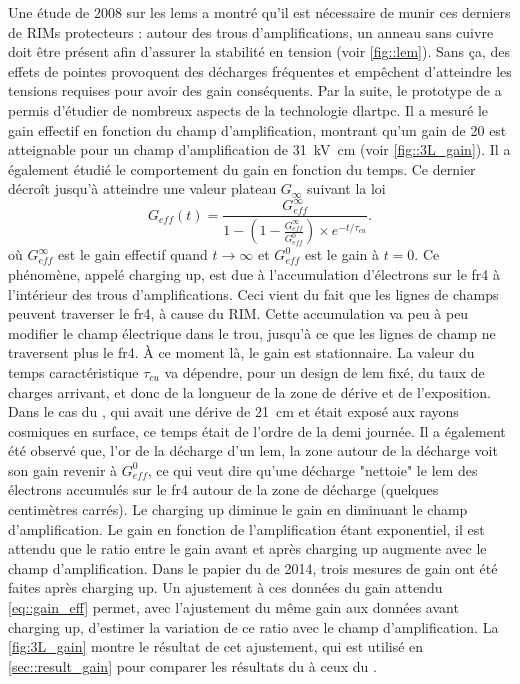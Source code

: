       Une étude de 2008 sur les \glspl{lem}\cite{Breskin2008} a montré qu'il est nécessaire de munir ces derniers de RIMs protecteurs : autour des trous d'amplifications, un anneau sans cuivre doit être présent afin d'assurer la stabilité en tension (voir \autoref{fig::lem}). Sans ça, des effets de pointes provoquent des décharges fréquentes et empêchent d'atteindre les tensions requises pour avoir des gain conséquents. Par la suite, le prototype de \threeL{}\cite{Cantini2013,Cantini2014} a permis d'étudier de nombreux aspects de la technologie \gls{dlartpc}. Il a mesuré le gain effectif en fonction du champ d'amplification, montrant qu'un gain de 20 est atteignable pour un champ d'amplification de \SI{31}{\kilo\volt\centi\meter} (voir \autoref{fig::3L_gain}). Il a également étudié le comportement du gain en fonction du temps. Ce dernier décroît jusqu'à atteindre une valeur plateau $G_{\infty}$ suivant la loi
      \begin{equation}
        G_{eff}(t) = \frac{G_{eff}^{\infty}}{1-(1-\frac{G_{eff}^{\infty}}{G_{eff}^0})\times e^{-t/\tau_{cu}}}.
      \end{equation}
      où $G_{eff}^{\infty}$ est le gain effectif quand $t\to\infty$ et $G_{eff}^0$ est le gain à $t=0$. Ce phénomène, appelé charging up, est due à l'accumulation d'électrons sur le \gls{fr4} à l'intérieur des trous d'amplifications. Ceci vient du fait que les lignes de champs peuvent traverser le \gls{fr4}, à cause du RIM. Cette accumulation va peu à peu modifier le champ électrique dans le trou, jusqu'à ce que les lignes de champ ne traversent plus le \gls{fr4}. À ce moment là, le gain est stationnaire. La valeur du temps caractéristique $\tau_{cu}$ va dépendre, pour un design de \gls{lem} fixé, du taux de charges arrivant, et donc de la longueur de la zone de dérive et de l'exposition. Dans le cas du \threeL{}, qui avait une dérive de \SI{21}{\centi\meter} et était exposé aux rayons cosmiques en surface, ce temps était de l'ordre de la demi journée. Il a également été observé que, l'or de la décharge d'un \gls{lem}, la zone autour de la décharge voit son gain revenir à $G_{eff}^0$, ce qui veut dire qu'une décharge "nettoie" le \gls{lem} des électrons accumulés sur le \gls{fr4} autour de la zone de décharge (quelques centimètres carrés).  Le charging up diminue le gain en diminuant le champ d'amplification. Le gain en fonction de l'amplification étant exponentiel, il est attendu que le ratio entre le gain avant et après charging up augmente avec le champ d'amplification. Dans le papier du \threeL{} de 2014, trois mesures de gain ont été faites après charging up. Un ajustement à ces données du gain attendu \eqref{eq::gain_eff} permet, avec l'ajustement du même gain aux données avant charging up, d'estimer la variation de ce ratio avec le champ d'amplification. La \autoref{fig:3L_gain} montre le résultat de cet ajustement, qui est utilisé en \autoref{sec::result_gain} pour comparer les résultats du \TOO{} à ceux du \threeL{}.

